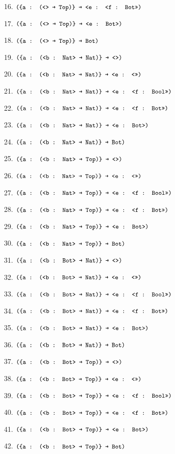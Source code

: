 \documentclass[dvipsnames]{article}
\let\codeOrig\code
\renewcommand{\code}[2][]{%
  \ifmmode
    \if\relax\detokenize{#1}\relax
      \mathchoice{\mbox{\normalfont\small\ttfamily #2}}{\mbox{\normalfont\small\ttfamily #2}}{\mbox{\normalfont\small\ttfamily #2}}{\mbox{\normalfont\small\ttfamily #2}}%
    \else
      \mathchoice{\mbox{\normalfont\small\ttfamily #2}}{\mbox{\normalfont\small\ttfamily #2}}{\mbox{\normalfont\small\ttfamily #2}}{\mbox{\normalfont\small\ttfamily #2}}%
    \fi
  \else
    \codeOrig[#1]{#2}%
  \fi}
\begin{document}
\begin{enumerate}
      16. $\code{(\{a : (<> → Top)\} → <e : <f : Bot>>)}$

      17. $\code{(\{a : (<> → Top)\} → <e : Bot>)}$

      18. $\code{(\{a : (<> → Top)\} → Bot)}$

      19. $\code{(\{a : (<b : Nat> → Nat)\} → <>)}$

      20. $\code{(\{a : (<b : Nat> → Nat)\} → <e : <>>)}$

      21. $\code{(\{a : (<b : Nat> → Nat)\} → <e : <f : Bool>>)}$

      22. $\code{(\{a : (<b : Nat> → Nat)\} → <e : <f : Bot>>)}$

      23. $\code{(\{a : (<b : Nat> → Nat)\} → <e : Bot>)}$

      24. $\code{(\{a : (<b : Nat> → Nat)\} → Bot)}$

      25. $\code{(\{a : (<b : Nat> → Top)\} → <>)}$

      26. $\code{(\{a : (<b : Nat> → Top)\} → <e : <>>)}$

      27. $\code{(\{a : (<b : Nat> → Top)\} → <e : <f : Bool>>)}$

      28. $\code{(\{a : (<b : Nat> → Top)\} → <e : <f : Bot>>)}$

      29. $\code{(\{a : (<b : Nat> → Top)\} → <e : Bot>)}$

      30. $\code{(\{a : (<b : Nat> → Top)\} → Bot)}$

      31. $\code{(\{a : (<b : Bot> → Nat)\} → <>)}$

      32. $\code{(\{a : (<b : Bot> → Nat)\} → <e : <>>)}$

      33. $\code{(\{a : (<b : Bot> → Nat)\} → <e : <f : Bool>>)}$

      34. $\code{(\{a : (<b : Bot> → Nat)\} → <e : <f : Bot>>)}$

      35. $\code{(\{a : (<b : Bot> → Nat)\} → <e : Bot>)}$

      36. $\code{(\{a : (<b : Bot> → Nat)\} → Bot)}$

      37. $\code{(\{a : (<b : Bot> → Top)\} → <>)}$

      38. $\code{(\{a : (<b : Bot> → Top)\} → <e : <>>)}$

      39. $\code{(\{a : (<b : Bot> → Top)\} → <e : <f : Bool>>)}$

      40. $\code{(\{a : (<b : Bot> → Top)\} → <e : <f : Bot>>)}$

      41. $\code{(\{a : (<b : Bot> → Top)\} → <e : Bot>)}$

      42. $\code{(\{a : (<b : Bot> → Top)\} → Bot)}$


\end{enumerate}
\end{document}
